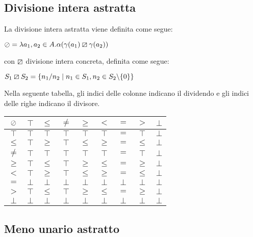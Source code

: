 \subsection{Divisione intera astratta}

La divisione intera astratta viene definita come segue:

\begin{center}
	$ \mathbin{\oslash} = \lambda a_1,a_2 \in A . \alpha(\gamma(a_1) \mathbin{\boxslash} \gamma(a_2)) $
\end{center}

con $\mathbin{\boxslash}$ divisione intera concreta, definita come segue:

\begin{center}
	$ S_1 \mathbin{\boxslash} S_2 = \{ n_1 / n_2 \mid n_1 \in S_1, n_2 \in S_2 \backslash \{0\} \} $
\end{center}
Nella seguente tabella, gli indici delle colonne indicano il dividendo e gli indici delle righe indicano il divisore.

\begin{center}
	\begin{tabular}{| c | c | c | c | c | c | c | c | c | }
		\hline
		$\mathbin{\oslash}$ & $\top$ & $\leq$ & $\neq$ & $\geq$ & $<$ & $=$ & $>$ & $\bot$ \\
		\hline
		$\top$ & $\top$ & $\top$ & $\top$ & $\top$ & $\top$ & $=$ & $\top$ & $\bot$\\
		\hline
		$\leq$ & $\top$ & $\geq$ & $\top$ & $\leq$ & $\geq$ & $=$ & $\leq$ & $\bot$\\
		\hline
		$\neq$ & $\top$ & $\top$ & $\top$ & $\top$ & $\top$ & $=$ & $\top$ & $\bot$\\
		\hline
		$\geq$ & $\top$ & $\leq$ & $\top$ & $\geq$ & $\leq$ & $=$ & $\geq$ & $\bot$\\
		\hline
		$<$ & $\top$ & $\geq$ & $\top$ & $\leq$ & $\geq$ & $=$ & $\leq$ & $\bot$\\
		\hline
		$=$ & $\bot$ & $\bot$ & $\bot$ & $\bot$ & $\bot$ & $\bot$ & $\bot$ & $\bot$\\
		\hline
		$>$ & $\top$ & $\leq$ & $\top$ & $\geq$ & $\leq$ & $=$ & $\geq$ & $\bot$\\
		\hline
		$\bot$ & $\bot$ & $\bot$ & $\bot$ & $\bot$ & $\bot$ & $\bot$ & $\bot$ & $\bot$\\
		\hline
	\end{tabular}
\end{center}

\subsection{Meno unario astratto}


